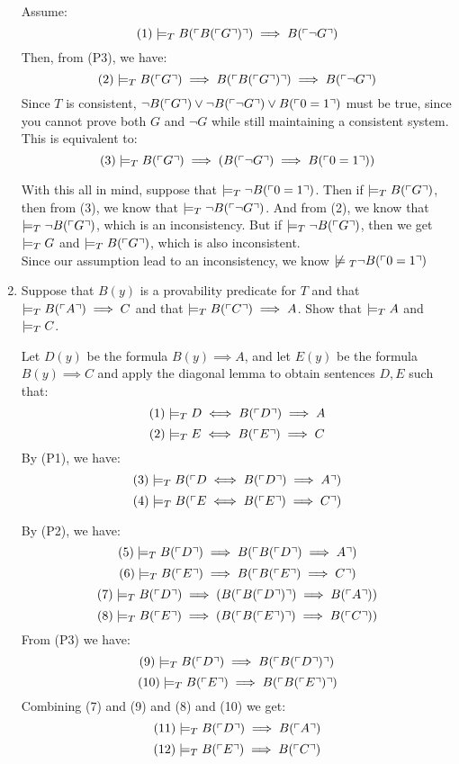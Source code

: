 \begin{enumerate}
    Assume:
    $$(1) \mathrel{|}\!=_T B(\ulcorner B(\ulcorner G \urcorner) \urcorner) \implies B(\ulcorner \neg G \urcorner)$$
    Then, from (P3), we have:
    $$(2) \mathrel{|}\!=_T B(\ulcorner G \urcorner) \implies B(\ulcorner B(\ulcorner G \urcorner) \urcorner) \implies B(\ulcorner \neg G \urcorner)$$
    Since $T$ is consistent, $\neg B(\ulcorner G \urcorner) \lor \neg B(\ulcorner \neg G \urcorner) \lor B(\ulcorner 0=1 \urcorner)$ must be true, since you cannot prove both $G$ and $\neg G$ while still maintaining a consistent system. This is equivalent to:
    $$(3) \mathrel{|}\!=_T B(\ulcorner G \urcorner) \implies (B(\ulcorner \neg G \urcorner) \implies B(\ulcorner 0=1 \urcorner))$$

    With this all in mind, suppose that $\mathrel{|}\!=_T \neg B(\ulcorner 0=1 \urcorner)$. Then if $\mathrel{|}\!=_T B(\ulcorner G \urcorner)$, then from (3), we know that $\mathrel{|}\!=_T \neg B(\ulcorner \neg G \urcorner)$. And from (2), we know that $\mathrel{|}\!=_T \neg B(\ulcorner G \urcorner)$, which is an inconsistency. But if $\mathrel{|}\!=_T \neg B(\ulcorner G \urcorner)$, then we get $\mathrel{|}\!=_T G$ and $\mathrel{|}\!=_T B(\ulcorner G \urcorner)$, which is also inconsistent.\\

    Since our assumption lead to an inconsistency, we know $\centernot \tarski_T \neg B(\brak{0=1})$


  \item
    \begin{question}
      Suppose that $B(y)$ is a provability predicate for $T$ and that $\mathrel{|}\!=_T B(\ulcorner A \urcorner) \implies C$ and that $\mathrel{|}\!=_T B(\ulcorner C \urcorner) \implies A$. Show that $\mathrel{|}\!=_T A$ and $\mathrel{|}\!=_T C$.
    \end{question}

    Let $D(y)$ be the formula $B(y) \implies A$, and let $E(y)$ be the formula $B(y) \implies C$ and apply the diagonal lemma to obtain sentences $D, E$ such that:
    $$(1) \mathrel{|}\!=_T D \iff B(\ulcorner D \urcorner) \implies A$$
    $$(2) \mathrel{|}\!=_T E \iff B(\ulcorner E \urcorner) \implies C$$
    By (P1), we have:
    $$(3) \mathrel{|}\!=_T B(\ulcorner D \iff B(\ulcorner D \urcorner) \implies A \urcorner)$$
    $$(4) \mathrel{|}\!=_T B(\ulcorner E \iff B(\ulcorner E \urcorner) \implies C \urcorner)$$

    By (P2), we have:
    $$(5) \mathrel{|}\!=_T B(\ulcorner D \urcorner) \implies B(\ulcorner B(\ulcorner D \urcorner) \implies A \urcorner)$$
    $$(6) \mathrel{|}\!=_T B(\ulcorner E \urcorner) \implies B(\ulcorner B(\ulcorner E \urcorner) \implies C \urcorner)$$
    $$(7) \mathrel{|}\!=_T B(\ulcorner D \urcorner) \implies (B(\ulcorner B(\ulcorner D \urcorner) \urcorner) \implies B(\ulcorner A \urcorner))$$
    $$(8) \mathrel{|}\!=_T B(\ulcorner E \urcorner) \implies (B(\ulcorner B(\ulcorner E \urcorner) \urcorner) \implies B(\ulcorner C \urcorner))$$
    From (P3) we have:
    $$(9) \mathrel{|}\!=_T B(\ulcorner D \urcorner) \implies B(\ulcorner B(\ulcorner D \urcorner) \urcorner)$$
    $$(10) \mathrel{|}\!=_T B(\ulcorner E \urcorner) \implies B(\ulcorner B(\ulcorner E \urcorner) \urcorner)$$
    Combining (7) and (9) and (8) and (10) we get:
    $$(11) \mathrel{|}\!=_T B(\ulcorner D \urcorner) \implies B(\ulcorner A \urcorner)$$
    $$(12) \mathrel{|}\!=_T B(\ulcorner E \urcorner) \implies B(\ulcorner C \urcorner)$$


\end{enumerate}
